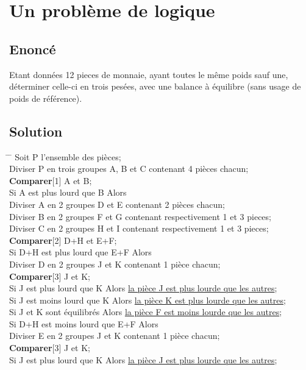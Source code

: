 \documentclass{article}
\newenvironment{statement}{\subsection{Enoncé}}{\pagebreak}
\newenvironment{solution}{\subsection{Solution}}{\pagebreak}
\begin{document}
\section{Un problème de logique}
\begin{statement}
Etant données 12 pieces de monnaie, ayant toutes le même poids sauf une, déterminer celle-ci en trois pesées, avec une balance à équilibre (sans usage de poids de référence).
\end{statement}
\begin{solution}
\begin{tabbing}
\hspace{1cm}\=\kill
\>\hspace{1cm}\=\kill
Soit P l'ensemble des pièces;\\
Diviser P en trois groupes A, B et C contenant 4 pièces chacun;\\
{\bf Comparer}[1] A et B;\\
Si A est plus lourd que B Alors\\
\> Diviser A en 2 groupes D et E contenant 2 pièces chacun;\\
\> Diviser B en 2 groupes F et G contenant respectivement 1 et 3 pieces;\\
\> Diviser C en 2 groupes H et I contenant respectivement 1 et 3 pieces;\\
\> {\bf Comparer}[2] D+H et E+F;\\
\> Si D+H est plus lourd que E+F Alors\\
\>\> Diviser D en 2 groupes J et K contenant 1 pièce chacun;\\
\>\> {\bf Comparer}[3] J et K;\\
\>\> Si J est plus lourd que K Alors \underline{la pièce J est plus lourde que les autres};\\
\>\> Si J est moins lourd que K Alors \underline{la pièce K est plus lourde que les autres};\\
\>\> Si J et K sont équilibrés Alors \underline{la pièce F est moins lourde que les autres};\\
\> Si D+H est moins lourd que E+F Alors\\
\>\> Diviser E en 2 groupes J et K contenant 1 pièce chacun;\\
\>\> {\bf Comparer}[3] J et K;\\
\>\> Si J est plus lourd que K Alors \underline{la pièce J est plus lourde que les autres};\\

\end{tabbing}
\end{solution}
\end{document}
